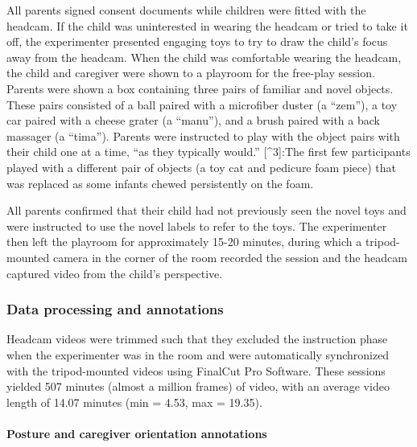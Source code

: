 \documentclass[english,man]{apa6}
\begin{document}
All parents signed consent documents while children were fitted with the
headcam. If the child was uninterested in wearing the headcam or tried
to take it off, the experimenter presented engaging toys to try to draw
the child's focus away from the headcam. When the child was comfortable
wearing the headcam, the child and caregiver were shown to a playroom
for the free-play session. Parents were shown a box containing three
pairs of familiar and novel objects. These pairs consisted of a ball
paired with a microfiber duster (a \enquote{zem}), a toy car paired with
a cheese grater (a \enquote{manu}), and a brush paired with a back
massager (a \enquote{tima}). Parents were instructed to play with the
object pairs with their child one at a time, \enquote{as they typically
would.} {[}\^{}3{]}:The first few participants played with a different
pair of objects (a toy cat and pedicure foam piece) that was replaced as
some infants chewed persistently on the foam.

All parents confirmed that their child had not previously seen the novel
toys and were instructed to use the novel labels to refer to the toys.
The experimenter then left the playroom for approximately 15-20 minutes,
during which a tripod-mounted camera in the corner of the room recorded
the session and the headcam captured video from the child's perspective.

\subsubsection{Data processing and
annotations}\label{data-processing-and-annotations}

Headcam videos were trimmed such that they excluded the instruction
phase when the experimenter was in the room and were automatically
synchronized with the tripod-mounted videos using FinalCut Pro Software.
These sessions yielded 507 minutes (almost a million frames) of video,
with an average video length of 14.07 minutes (min = 4.53, max = 19.35).

\paragraph{Posture and caregiver orientation
annotations}\label{posture-and-caregiver-orientation-annotations}
\end{document}
